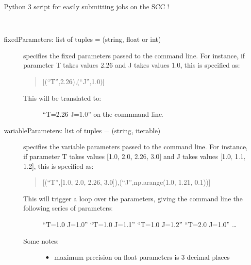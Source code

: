\documentclass[letterpaper,10pt,english]{sphinxmanual}
\begin{document}
\begin{fulllineitems}
\label{\detokenize{masta:ezsub.EZSUB}}
Python 3 script for easily submitting jobs on the SCC !

\begin{fulllineitems}
\label{\detokenize{masta:ezsub.EZSUB.submit}}~\begin{description}
\item[{fixedParameters: list of tuples = (string, float or int)}] \leavevmode
specifies the fixed parameters passed to the command line.
For instance, if parameter T takes values 2.26 and J takes values 1.0, this is specified as:
\begin{quote}

{[}(“T”,2.26),(“J”,1.0){]}
\end{quote}
\begin{description}
\item[{This will be translated to:}] \leavevmode
“T=2.26 J=1.0” on the commmand line.

\end{description}

\item[{variableParameters: list of tuples = (string, iterable)}] \leavevmode
specifies the variable parameters passed to the command line.
For instance, if parameter T takes values {[}1.0, 2.0, 2.26, 3.0{]} and J takes values {[}1.0, 1.1, 1.2{]}, this is specified as:
\begin{quote}

{[}(“T”,{[}1.0, 2.0, 2.26, 3.0{]}),(“J”,np.arange(1.0, 1.21, 0.1)){]}
\end{quote}
\begin{description}
\item[{This will trigger a loop over the parameters, giving the command line the following series of parameters:}] \leavevmode
“T=1.0 J=1.0” 
“T=1.0 J=1.1”
“T=1.0 J=1.2”
“T=2.0 J=1.0”
…

\item[{Some notes: }] \leavevmode\begin{itemize}
\item {} 
maximum precision on float parameters is 3 decimal places


\end{itemize}
\end{description}
\end{description}
\end{fulllineitems}
\end{fulllineitems}
\end{document}

